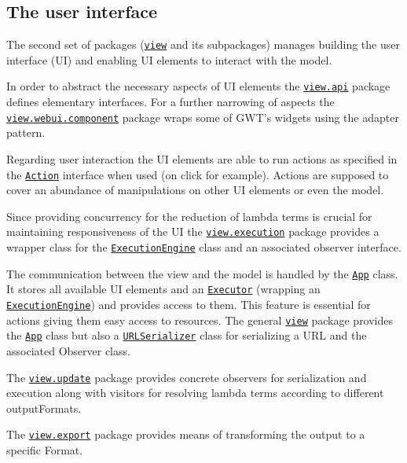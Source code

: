 \documentclass[a4paper, parskip=half]{scrartcl}
\newcommand{\pkglnk}[1]{\hyperref[pkg:edu.kit.wavelength.client.#1]{#1}}
\begin{document}
\subsection{The user interface}

The second set of packages (\texttt{\pkglnk{view}} and its subpackages) manages building the user 
interface (UI) and enabling UI elements to interact with the model.

In order to abstract the necessary aspects of UI elements the \texttt{\pkglnk{view.api}} package 
defines elementary interfaces.
For a further narrowing of aspects the \texttt{\pkglnk{view.webui.component}} package wraps some of 
GWT's widgets using the adapter pattern.

Regarding user interaction the UI elements are able to run actions as specified in the 
\texttt{\hyperref[type:edu.kit.wavelength.client.view.action.Action]{Action}} interface when used (on click for example).
Actions are supposed to cover an abundance of manipulations on other UI elements or even the model.

Since providing concurrency for the reduction of lambda terms is crucial for maintaining responsiveness of the UI 
the \texttt{\pkglnk{view.execution}} package provides a wrapper class for the \texttt{\hyperref[type:edu.kit.wavelength.client.model.ExecutionEngine]{ExecutionEngine}} class and an associated
observer interface.

The communication between the view and the model is handled by the \texttt{\hyperref[type:edu.kit.wavelength.client.view.App]{App}} class. It stores all available UI elements and
an \texttt{\hyperref[type:edu.kit.wavelength.client.view.execution.Executor]{Executor}} (wrapping an \texttt{\hyperref[type:edu.kit.wavelength.client.model.ExecutionEngine]{ExecutionEngine}}) and provides access to them. 
This feature is essential for actions giving them easy access to resources.
The general \texttt{\pkglnk{view}} package provides the \texttt{\hyperref[type:edu.kit.wavelength.client.view.App]{App}} class but also a 
\texttt{\hyperref[type:edu.kit.wavelength.client.view.URLSerializer]{URLSerializer}} class for serializing a URL and the associated Observer class.

The \texttt{\pkglnk{view.update}} package provides concrete observers for serialization and execution along with
visitors for resolving lambda terms according to different outputFormats.

The \texttt{\pkglnk{view.export}} package provides means of transforming the output to a specific Format.
\end{document}
